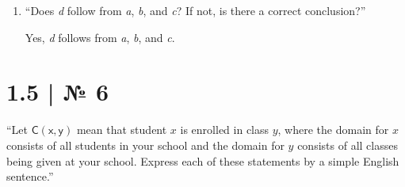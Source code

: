 \documentclass[
   paper=a4,
   fontsize=11pt,
   parskip=no,       %
   fleqn             %
]{scrartcl}
\newcommand{\Pm}[1]{\ensuremath{\mathsf{#1}}}
\newcommand{\Pv}[1]{\ensuremath{\mathit{#1}}}
\begin{document}
\begin{enumerate}[
      leftmargin=0pt, labelsep=0.25em,
      label=\textsf{\textbf{\alph*)}}
]

   \item “Does \textit{d} follow from \textit{a}, \textit{b}, and \textit{c}? If not, is there a
   correct conclusion?”

   Yes, \textit{d} follows from \textit{a}, \textit{b}, and \textit{c}.

\end{enumerate}

\section*{1.5 | № 6}
\begin{addmargin}[2.5em]{2.5em}{\sffamily
   “Let \Pm{C(x, y)} mean that student \Pv{x} is enrolled in class \Pv{y}, where the domain for
   \Pv{x} consists of all students in your school and the domain for \Pv{y} consists of all classes
   being given at your school. Express each of these statements by a simple English sentence.”
}\end{addmargin}

\begin{enumerate}[
      leftmargin=0pt, labelsep=0.25em,
      label=\textsf{\textbf{\alph*)}}
]
\begin{multicols}{2}
\raggedcolumns



\end{multicols}
\end{enumerate}
\end{document}

